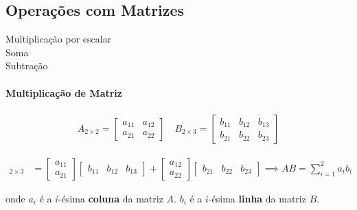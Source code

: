 \documentclass[11pt, oneside, a4paper, article]{article}
\numberwithin{equation}{section}
\begin{document}
\begin{description}
\subsection{Operações com Matrizes}

\begin{description}
	\item[Multiplicação por escalar] 
	\item[Soma] 
	\item[Subtração] 
\end{description}

\paragraph{Multiplicação de Matriz}

\begin{align*}
A_{2 \times 2} =
\begin{bmatrix}
	a_{11} & a_{12} \\
	a_{21} & a_{22}		
\end{bmatrix}
\quad
B_{2 \times 3} =
\begin{bmatrix}
	b_{11} & b_{12} & b_{13} \\
	b_{21} & b_{22} & b_{23}		
\end{bmatrix}
\end{align*}

\begin{align*}
[AB]_{2 \times 3} &=
\begin{bmatrix}
	a_{11} \\ a_{21}
\end{bmatrix}
\begin{bmatrix}
	b_{11} & b_{12} & b_{13}
\end{bmatrix}
+
\begin{bmatrix}
	a_{12} \\ a_{22}
\end{bmatrix}
\begin{bmatrix}
	b_{21} & b_{22} & b_{23}
\end{bmatrix}
\implies
AB = \sum_{i=1}^{2} a_{i}b_{i}
\end{align*}

\noindent
onde
$a_{i}$ é a $i$-ésima \textbf{coluna} da matriz $A$.
$b_{i}$ é a $i$-ésima \textbf{linha} da matriz $B$.


\end{description}
\end{document}
